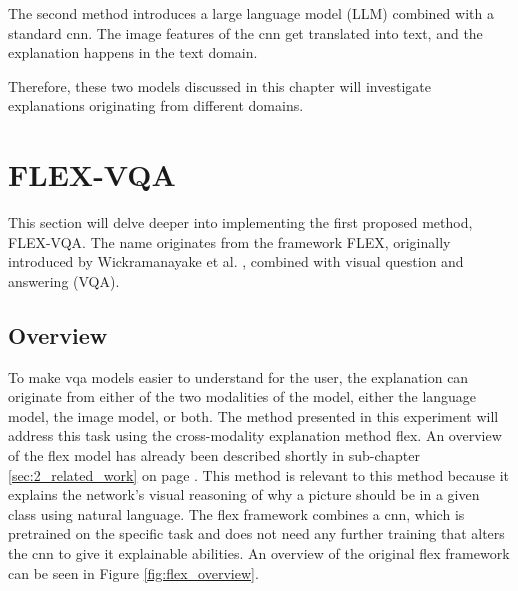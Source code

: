 The second method introduces a large language model (LLM) combined with a standard \gls{cnn}. The image features of the \gls{cnn} get translated into text, and the explanation happens in the text domain. 

Therefore, these two models discussed in this chapter will investigate explanations originating from different domains.


    \section{FLEX-VQA}

    This section will delve deeper into implementing the first proposed method, FLEX-VQA. The name originates from the framework FLEX, originally introduced by Wickramanayake et al. \cite{wickramanayakeFLEXFaithfulLinguistic2019}, combined with visual question and answering (VQA). 
    
    \label{sec3:flex_vqa}
        \subsection{Overview}

        To make \gls{vqa} models easier to understand for the user, the explanation can originate from either of the two modalities of the model, either the language model, the image model, or both. 
        The method presented in this experiment will address this task using the cross-modality explanation method \gls{flex}. An overview of the \gls{flex} model has already been described shortly in sub-chapter \ref{sec:2_related_work} on page \pageref{sec:2_related_work}. This method is relevant to this method because it explains the network's visual reasoning of why a picture should be in a given class using natural language. The \gls{flex} framework combines a \gls{cnn}, which is pretrained on the specific task and does not need any further training that alters the \gls{cnn} to give it explainable abilities. An overview of the original \gls{flex} framework can be seen in Figure \ref{fig:flex_overview}.

